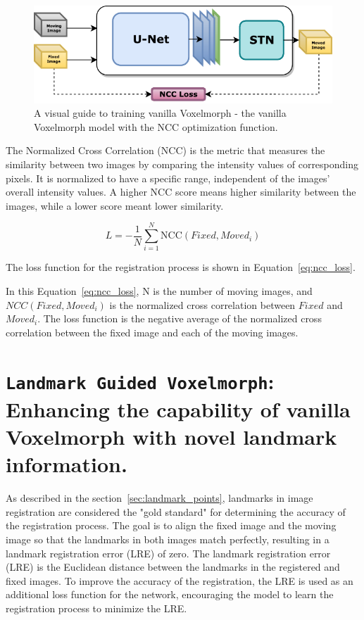\documentclass{book}
\begin{document}
	\begin{figure}[h!]
		\centering
		\includegraphics{resources/chapter4/methods/method1.pdf}
		\caption{A visual guide to training vanilla Voxelmorph - the vanilla Voxelmorph model with the NCC optimization function.}
		\label{fig:block_method1}
	\end{figure}
	
	The Normalized Cross Correlation (NCC) is the metric that measures the similarity between two images by comparing the intensity values of corresponding pixels. It is normalized to have a specific range, independent of the images' overall intensity values. A higher NCC score means higher similarity between the images, while a lower score meant lower similarity.
	
	\begin{equation}\label{eq:ncc_loss}
	L = -\frac{1}{N} \sum_{i=1}^N \text{NCC}(Fixed, Moved_i)
	\end{equation}
	
	The loss function for the registration process is shown in Equation~\ref{eq:ncc_loss}.
	
	In this Equation~\ref{eq:ncc_loss}, N is the number of moving images, and $NCC(Fixed, Moved_i)$ is the normalized cross correlation between $Fixed$ and $Moved_i$. The loss function is the negative average of the normalized cross correlation between the fixed image and each of the moving images.
	
	\section{\texttt{Landmark Guided Voxelmorph}: Enhancing the capability of vanilla Voxelmorph with novel landmark information.}
	As described in the section~\ref{sec:landmark_points}, landmarks in image registration are considered the "gold standard" for determining the accuracy of the registration process. The goal is to align the fixed image and the moving image so that the landmarks in both images match perfectly, resulting in a landmark registration error (LRE) of zero. The landmark registration error (LRE) is the Euclidean distance between the landmarks in the registered and fixed images. To improve the accuracy of the registration, the LRE is used as an additional loss function for the network, encouraging the model to learn the registration process to minimize the LRE.
	
\end{document}
